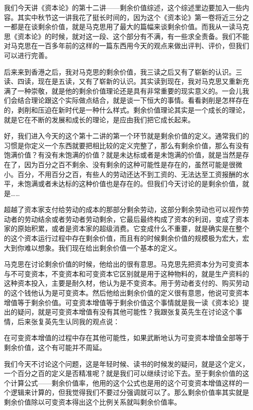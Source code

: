 \documentclass[UTF8, 12pt, a4paper]{ctexrep}
\begin{document}
我们今天讲《资本论》的第十二讲——剩余价值综述，这个综述里边要加入一些内容。其实中秋节这一讲我花了挺长时间的，因为这个《资本论》第一卷将近三分之一都是在谈剩余价值，就是马克思用了最大的篇幅来谈剩余价值。而我从一读马克思《资本论》的时候，就对这一段、这个部分有不满，有一些求全责备。我们不能对马克思在一百多年前的这样的一篇东西用今天的观点来做出评判、评价，但我们可以进行完善。

后来来到香港之后，我对马克思的剩余价值，我三读之后又有了崭新的认识。三读、四读，现在是五读，又有了崭新的认识。其实读到现在，我对马克思又重新充满了一种崇敬，就是他的剩余价值理论还是具有非常重要的现实意义的。一会儿我们会结合理论跟这个实际做点结合，就是谈一下恒大的事情。看看剥削是怎样存在的，剥削和压迫在新时代是一种什么样式。剩余价值理论其实是一个成长的理论，就是它在不断的发展和成长的理论，是应由我们把它成长起来。

好，我们进入今天的这个第十二讲的第一个环节就是剩余价值的定义。通常我们的习惯是你定义一个东西就要把相比较的定义完整了，那么有剩余价值，那么有没有饱满价值？有没有未饱满的价值？就是未达标或者是未饱满的价值，就是当然是存在了，因为百分之百不剩余、没有剩余的这种可能性是存在的，虽然可能是很微小。百分，不用百分之百，有些人的劳动还达不到工资的、无法达至工资报酬的水平，未饱满或者未达标的这种价值也是存在的。但我们今天讨论的是剩余价值，就是……

超越了资本家支付给劳动的成本的那部分剩余劳动，这部分剩余劳动也可以视作劳动者的劳动结余或者劳动者劳动剩余，它最后最终构成了资本的利润，变成了资本家的原始积累，或者是资本家的超级消费。它变成什么不重要，就是确实是在整个的这个资本运行过程中存在剩余价值，而且有的时候剩余价值的规模极为宏大，宏大到你难以想象。我们现在给出剩余价值一个基本的定义。

马克思在讨论剩余价值的时候，他给出的很有意思。马克思先把资本分为可变资本与不可变资本，不变资本和可变资本它区别就是用于这种物料的，就是生产资料的这种资本投入，主要是耐久材，他认为是不变资本。用于劳动者支付的、购买劳动的这个钱他认为是可变资本。然后他给出剩余价值的定义很有意思，他说可变资本增值等于剩余价值。可变资本增值等于剩余价值这个事情就是我一读《资本论》提出的疑问，就是可变资本增值有没有其他可能性？我跟张复英先生在讨论这个事情，后来张复英先生认同我的观点说：

{\kaishu 在可变资本增值的过程中存在其他可能性，如果武断地认为可变资本增值全部等于剩余价值，这个有可能并不周延。}

我们今天不讨论这个问题，这是年轻时候、读书的时候发的疑问，就是这个定义，一个百分之百的定义是否精准呢？就是我们可以继续讨论下去。至于剩余价值的这个计算公式——剩余价值率，他用的这个公式也是用的这个可变资本增值这样的一个逻辑来计算的，但我觉得我们不要过分强调就可以了。那么剩余价值率其实就是剩余价值除以可变资本得出这个比例关系就叫剩余价值率。
\end{document}
